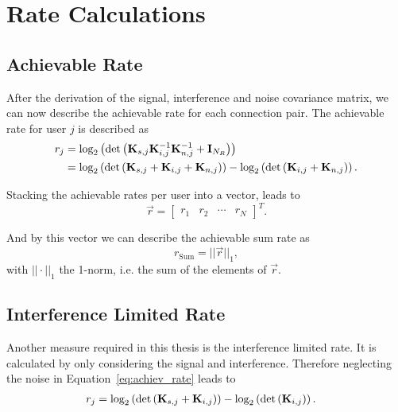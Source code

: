 


\section{Rate Calculations}
\label{sec:rates}

\subsection{Achievable Rate}
\label{sec:achiev_rate}
After the derivation of the signal, interference and noise covariance matrix, we can now describe the achievable rate for each connection pair.
The achievable rate for user $j$ is described as
\begin{align}
\label{eq:achiev_rate}
\nonumber
r_j &= \text{log}_2\left(\text{det}\left(\mathbf{K}_{s,j}\mathbf{K}_{i,j}^{-1}\mathbf{K}_{n,j}^{-1}+\mathbf{I}_{N_R}\right)\right)\\
 &=\text{log}_2\left(\text{det}\left(\mathbf{K}_{s,j}+\mathbf{K}_{i,j}+\mathbf{K}_{n,j}\right)\right) -
	     	\text{log}_2\left(\text{det}\left(\mathbf{K}_{i,j}+\mathbf{K}_{n,j}\right)\right).
\end{align}

Stacking the achievable rates per user into a vector, leads to 
\begin{equation}
\label{eq:achiev_vec}
\vec{r} =
\begin{bmatrix}
r_1 & r_2 & \cdots & r_N
\end{bmatrix}^T.
\end{equation}

And by this vector we can describe the achievable sum rate as
\begin{equation}
\label{eq:achiev_sum_rate}
r_\text{Sum} = ||\vec{r}||_1,
\end{equation}
with $||\cdot||_1$ the 1-norm, i.e. the sum of the elements of $\vec{r}$.

\subsection{Interference Limited Rate}
\label{sec:sir_rate}
Another measure required in this thesis is the interference limited rate.
It is calculated by only considering the signal and interference.
Therefore neglecting the noise in Equation~\ref{eq:achiev_rate} leads to
\begin{align}
\label{eq:sir_rate}
r_j &=\text{log}_2\left(\text{det}\left(\mathbf{K}_{s,j}+\mathbf{K}_{i,j}\right)\right) -
	     	\text{log}_2\left(\text{det}\left(\mathbf{K}_{i,j}\right)\right).
\end{align}


